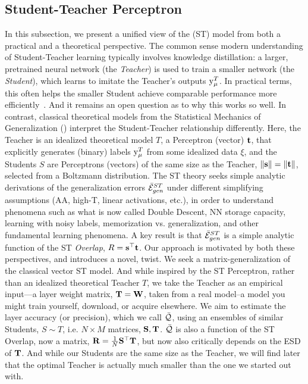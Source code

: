 \subsection{Student-Teacher Perceptron}
\label{sxn:SMOG_main-student_teacher}

In this subsection, we present a unified view of the \emph{\StudentTeacher} (ST) \Perceptron 
model from both a practical and a theoretical perspective.  
The common sense modern understanding of Student-Teacher learning typically involves knowledge distillation: a larger, pretrained neural network (the \emph{Teacher}) is used to train a smaller network (the \emph{Student}), which learns to imitate the Teacher’s outputs $\mathrm{y}_{\mu}^{T}$.
In practical terms, this often helps the smaller Student achieve comparable performance more efficiently~\cite{hu2023TS}.
And it remains an open question as to why this works so well.
In contrast, classical theoretical models from the Statistical Mechanics of Generalization (\SMOG) interpret the Student-Teacher relationship differently. Here, the Teacher is an idealized theoretical model $T$, a Perceptron (vector) ${\mathbf{t}}$, that explicitly generates (binary) labels $\mathrm{y}_{\mu}^{T}$ from some idealized data $\xi$, and the Students
$S$ are Perceptrons (vectors) of the same size as the Teacher, $\Vert{\mathbf{s}}\Vert=\Vert{\mathbf{t}}\Vert$, selected from a Boltzmann distribution.
The ST theory seeks simple analytic derivations of the generalization errors $\bar{\mathcal{E}}^{ST}_{gen}$ under different simplifying assumptions (AA, high-T, linear activations, etc.),
in order to understand phenomena such as what is now called Double Descent\cite{Vallet1989}, NN storage capacity, learning with noisy labels,  memorization vs. generalization, and other 
fundamental learning phenomena\cite{Opper01,OK96_CHAPT,Eng01,EngelAndVanDenBroeck,SST90,SST92}.
A key result is that $\bar{\mathcal{E}}^{ST}_{gen}$ is a simple analytic function of the ST \emph{Overlap}, $R={\mathbf{s}}^{\top}{\mathbf{t}}$.
Our \SETOL approach is motivated by both these perspectives, and introduces a novel, \SemiEmpirical twist. 
We seek a matrix-generalization of the classical vector ST model.
And while inspired by the ST Perceptron, 
rather than an idealized theoretical Teacher $T$, we take the Teacher as an empirical input—a layer weight matrix, ${\mathbf{T}}={\mathbf{W}}$,
taken from a real model--a model you might train yourself, download, or acquire elsewhere.
We aim to estimate the layer accuracy (or precision),
which we call \LayerQuality $\bar{\mathcal{Q}}$, using an ensembles of similar Students, $S\sim T$, i.e. $N \times M$ matrices, ${\mathbf{S}},{\mathbf{T}}$.
$\bar{\mathcal{Q}}$ is also a function of the ST Overlap, now a matrix,
$\mathbf{R}=\tfrac{1}{N}{\mathbf{S}}^{\top}{\mathbf{T}}$,
but now also critically depends on the ESD of ${\mathbf{T}}$.
And while our Students are the same size as the Teacher, 
we will find later that the optimal Teacher is actually much smaller than the one we started out with. 

